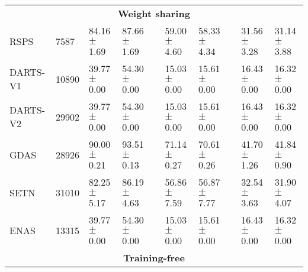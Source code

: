 \documentclass{article}
\begin{document}
\begin{table*}[!h]
\begin{adjustbox}{width=2\columnwidth,center}
\begin{tabular}{@{}llllcllcll@{}}
\multicolumn{10}{c}{\textbf{Weight sharing}}\\
RSPS                & 7587  & 84.16$\pm$1.69 & 87.66$\pm$1.69 && 59.00$\pm$4.60 & 58.33$\pm$4.34 && 31.56$\pm$3.28 & 31.14$\pm$3.88 \\
DARTS-V1            & 10890 & 39.77$\pm$0.00 & 54.30$\pm$0.00 && 15.03$\pm$0.00 & 15.61$\pm$0.00 && 16.43$\pm$0.00 & 16.32$\pm$0.00 \\
DARTS-V2            & 29902 & 39.77$\pm$0.00 & 54.30$\pm$0.00 && 15.03$\pm$0.00 & 15.61$\pm$0.00 && 16.43$\pm$0.00 & 16.32$\pm$0.00 \\
GDAS                & 28926 & 90.00$\pm$0.21 & 93.51$\pm$0.13 && 71.14$\pm$0.27 & 70.61$\pm$0.26 && 41.70$\pm$1.26 & 41.84$\pm$0.90 \\
SETN                & 31010 & 82.25$\pm$5.17 & 86.19$\pm$4.63 && 56.86$\pm$7.59 & 56.87$\pm$7.77 && 32.54$\pm$3.63 & 31.90$\pm$4.07 \\
ENAS                & 13315 & 39.77$\pm$0.00 & 54.30$\pm$0.00 && 15.03$\pm$0.00 & 15.61$\pm$0.00 && 16.43$\pm$0.00 & 16.32$\pm$0.00 \\
\midrule
\multicolumn{10}{c}{\textbf{Training-free}}\\



\end{tabular}
\end{adjustbox}
\end{table*}
\end{document}
